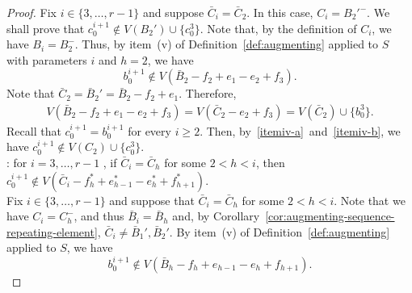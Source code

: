 \documentclass[12pt,reqno,a4paper]{amsart}
\begin{document}
\begin{proof}
Fix \(i\in\{3,\ldots,r-1\}\) and suppose $\bar C_i= \bar C_2$. In this case, $C_i =B_2'^-$. 
We shall prove that 
$c_0^{i+1}\notin V(B_2')\cup\{c_0^3\}$. Note that, by the definition of 
\(C_i\), we have \(B_i = B_2^-\). Thus,
by item~(v) of Definition~\ref{def:augmenting} applied to \(S\)
with parameters \(i\) and \(h = 2\),
we have 
\begin{equation}\label{itemiv-a}
b_0^{i+1} \notin V(\bar B_2- f_2 + e_1 - e_2 + f_3).
\end{equation}
Note that %
\(\bar C_2 = \bar B_2' = \bar B_2- f_2 + e_1\).
Therefore, 
\begin{align}\label{itemiv-b}
V(\bar B_2- f_2 + e_1 - e_2 + f_3)
	= V(\bar C_2- e_2 + f_3)%
	= V(\bar C_2)\cup \{b_0^3\}.
\end{align}
Recall that \(c_0^{i+1} = b_0^{i+1}\) for every \(i\geq 2\). Then, 
by~\eqref{itemiv-a}~and~\eqref{itemiv-b}, 
we have \(c_0^{i+1} \notin V(C_2)\cup\{c_0^3\}\).
\\


:  
for \(i=3,\ldots,r-1\) , 
if \(\bar C_i = \bar C_{h}\) for some \(2<h <i\), 
then %
\(c_0^{i+1}\notin V(\bar C_i - f_h^*  + e_{h-1}^* - e_h^*+ f_{h+1}^*)\).\\

Fix $i\in\{3,\ldots,r-1\}$  and suppose that
\(\bar C_i = \bar C_{h}\) for some \(2<h<i\). 
Note that we have \(C_i = C_{h}^-\), and thus \(\bar B_i = \bar B_{h}\) and, 
by Corollary~\ref{cor:augmenting-sequence-repeating-element},
$\bar C_i\neq \bar B_1',\bar B_2'$.
By item~(v) of Definition~\ref{def:augmenting} applied to \(S\), 
we have
\begin{equation}\label{itemv-a}
b_0^{i+1} \notin  V(\bar B_h - f_h + e_{h-1}  - e_h + f_{h+1}). 
\end{equation}


\end{proof}
\end{document}
